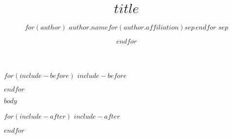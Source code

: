\documentclass[final]{beamer}
\title{$title$}
\author{%
$for(author)$
  $author.name$$for(author.affiliation)$\inst{$author.affiliation$}$sep$\,$endfor$%
$sep$\and%
$endfor$
}
\institute{%
$for(affiliation)$
\inst{$affiliation.key$}
  $for(affiliation.name)$
    $affiliation.name$$sep$\\
  $endfor$
  $sep$\and%
$endfor$
}
\begin{document}
$for(include-before)$
$include-before$

$endfor$
\begin{frame}[t,fragile]
$body$
\end{frame}
$for(include-after)$
$include-after$

$endfor$
\end{document}
